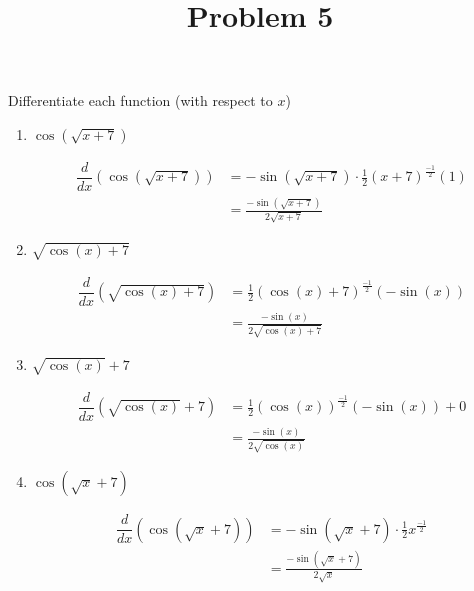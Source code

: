 \documentclass{ximera}
\title[Problem 5]{Problem 5}
\begin{document}
\begin{abstract} \end{abstract}
\maketitle


\begin{problem}
Differentiate each function (with respect to $x$)
	\begin{enumerate}
	
	\item  $\cos \left( \sqrt{x+7} \right) $
		\begin{explanation}
		\begin{align*}
		\dfrac{d}{dx} \left( \cos \left( \sqrt{x+7} \right) \right) &= -\sin \left( \sqrt{x+7} \right) \cdot \frac{1}{2} (x+7)^{\frac{-1}{2}} (1) \\
		&= \frac{-\sin \left( \sqrt{x+7} \right) }{2 \sqrt{x+7}}
		\end{align*}
		\end{explanation}
	\item  $\sqrt{ \cos(x) + 7}$
		\begin{explanation}
		\begin{align*}
		\dfrac{d}{dx} \left( \sqrt{ \cos(x) + 7} \right) &= \frac{1}{2} \left( \cos(x) + 7 \right)^{\frac{-1}{2}} \left( -\sin(x) \right) \\
		&= \frac{- \sin(x) }{2 \sqrt{\cos(x) + 7 }}
		\end{align*}
		\end{explanation}
	\item $\sqrt{\cos(x)} + 7$
		\begin{explanation}
		\begin{align*}
		\dfrac{d}{dx} \left( \sqrt{\cos(x)} + 7 \right) &=  \frac{1}{2} \left( \cos(x) \right)^{\frac{-1}{2}} \left( -\sin(x) \right) + 0  \\
		&= \frac{- \sin(x)}{2 \sqrt{\cos(x)}}
		\end{align*}
		\end{explanation}
	\item  $\cos \left( \sqrt{x} + 7 \right)$
		\begin{explanation}
		\begin{align*}
		\dfrac{d}{dx} \left( \cos \left( \sqrt{x} + 7 \right) \right) &= - \sin \left( \sqrt{x} + 7 \right) \cdot \frac{1}{2} x^{\frac{-1}{2}} \\
		&=  \frac{- \sin \left( \sqrt{x} + 7 \right) }{2 \sqrt{x}}

\end{align*}
\end{explanation}
\end{enumerate}
\end{problem}
\end{document}
